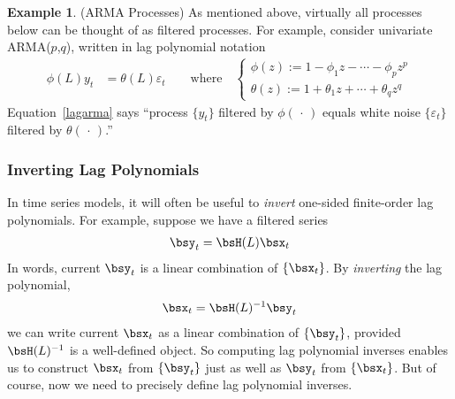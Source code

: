 \documentclass[12pt]{article}
\theoremstyle{plain}
\theoremstyle{definition}
\newtheorem{ex}[thm]{Example}
\theoremstyle{remark}
\begin{document}
\begin{ex}(ARMA Processes)
\label{ex:armafiltered}
As mentioned above, virtually all processes below can be thought of as
filtered processes.
For example, consider univariate ARMA($p$,$q$), written in lag
polynomial notation
\begin{align}
  \phi(L)y_t
  &=
  \theta(L)\varepsilon_t
  \qquad
  \text{where}\quad
  \begin{cases}
  \phi(z) := 1 - \phi_1 z - \cdots - \phi_pz^p \\
  \theta(z) := 1+ \theta_1 z + \cdots +\theta_qz^q
  \end{cases}
  \label{lagarma}
\end{align}
Equation~\ref{lagarma} says ``process $\{y_t\}$ filtered by
$\phi(\,\cdot\,)$ equals white noise $\{\varepsilon_t\}$ filtered by
$\theta(\,\cdot\,)$.''
\end{ex}


\clearpage
\subsubsection{Inverting Lag Polynomials}

In time series models, it will often be useful to \emph{invert}
one-sided finite-order lag polynomials. For example, suppose we have a
filtered series
\begin{align}
  \bsy_t = \bsH(L) \bsx_t
  \label{laginvy}
\end{align}
In words, current $\bsy_t$ is a linear combination of $\{\bsx_t\}$. By
\emph{inverting} the lag polynomial,
\begin{align}
  \bsx_t = \bsH(L)^{-1} \bsy_t
  \label{laginvx}
\end{align}
we can write current $\bsx_t$ as a linear combination of $\{\bsy_t\}$,
provided $\bsH(L)^{-1}$ is a well-defined object.
So computing lag polynomial inverses enables us to construct $\bsx_t$
from $\{\bsy_t\}$ just as well as $\bsy_t$ from $\{\bsx_t\}$.
But of course, now we need to precisely define lag polynomial inverses.
\end{document}
